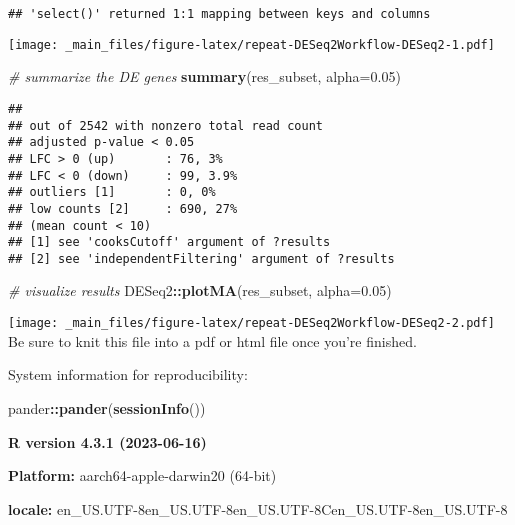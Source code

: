 \documentclass[
]{book}
\newenvironment{Shaded}{\begin{snugshade}}{\end{snugshade}}
\newcommand{\AttributeTok}[1]{\textcolor[rgb]{0.13,0.29,0.53}{#1}}
\newcommand{\CommentTok}[1]{\textcolor[rgb]{0.56,0.35,0.01}{\textit{#1}}}
\newcommand{\FloatTok}[1]{\textcolor[rgb]{0.00,0.00,0.81}{#1}}
\newcommand{\FunctionTok}[1]{\textcolor[rgb]{0.13,0.29,0.53}{\textbf{#1}}}
\newcommand{\NormalTok}[1]{#1}
\newcommand{\SpecialCharTok}[1]{\textcolor[rgb]{0.81,0.36,0.00}{\textbf{#1}}}
\begin{document}
\begin{verbatim}
## 'select()' returned 1:1 mapping between keys and columns
\end{verbatim}

\texttt{[image: \_main\_files/figure-latex/repeat-DESeq2Workflow-DESeq2-1.pdf]}

\begin{Shaded}
\begin{Highlighting}[]
\CommentTok{\# summarize the DE genes}
\FunctionTok{summary}\NormalTok{(res\_subset, }\AttributeTok{alpha=}\FloatTok{0.05}\NormalTok{)}
\end{Highlighting}
\end{Shaded}

\begin{verbatim}
## 
## out of 2542 with nonzero total read count
## adjusted p-value < 0.05
## LFC > 0 (up)       : 76, 3%
## LFC < 0 (down)     : 99, 3.9%
## outliers [1]       : 0, 0%
## low counts [2]     : 690, 27%
## (mean count < 10)
## [1] see 'cooksCutoff' argument of ?results
## [2] see 'independentFiltering' argument of ?results
\end{verbatim}

\begin{Shaded}
\begin{Highlighting}[]
\CommentTok{\# visualize results}
\NormalTok{DESeq2}\SpecialCharTok{::}\FunctionTok{plotMA}\NormalTok{(res\_subset, }\AttributeTok{alpha=}\FloatTok{0.05}\NormalTok{)}
\end{Highlighting}
\end{Shaded}

\texttt{[image: \_main\_files/figure-latex/repeat-DESeq2Workflow-DESeq2-2.pdf]}
Be sure to knit this file into a pdf or html file once you're finished.

System information for reproducibility:

\begin{Shaded}
\begin{Highlighting}[]
\NormalTok{pander}\SpecialCharTok{::}\FunctionTok{pander}\NormalTok{(}\FunctionTok{sessionInfo}\NormalTok{())}
\end{Highlighting}
\end{Shaded}

\textbf{R version 4.3.1 (2023-06-16)}

\textbf{Platform:} aarch64-apple-darwin20 (64-bit)

\textbf{locale:}
en\_US.UTF-8\textbar\textbar en\_US.UTF-8\textbar\textbar en\_US.UTF-8\textbar\textbar C\textbar\textbar en\_US.UTF-8\textbar\textbar en\_US.UTF-8
\end{document}
